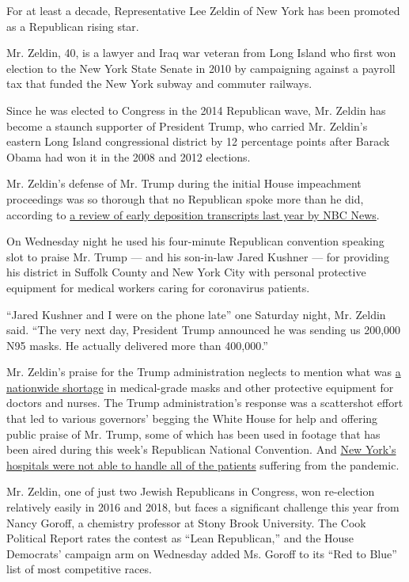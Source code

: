 For at least a decade, Representative Lee Zeldin of New York has been
promoted as a Republican rising star.

Mr. Zeldin, 40, is a lawyer and Iraq war veteran from Long Island who
first won election to the New York State Senate in 2010 by campaigning
against a payroll tax that funded the New York subway and commuter
railways.

Since he was elected to Congress in the 2014 Republican wave, Mr. Zeldin
has become a staunch supporter of President Trump, who carried Mr.
Zeldin's eastern Long Island congressional district by 12 percentage
points after Barack Obama had won it in the 2008 and 2012 elections.

Mr. Zeldin's defense of Mr. Trump during the initial House impeachment
proceedings was so thorough that no Republican spoke more than he did,
according to
\href{https://www.nbcnews.com/politics/trump-impeachment-inquiry/trump-s-defender-how-little-known-gop-lawmaker-became-point-n1076046}{a
review of early deposition transcripts last year by NBC News}.

On Wednesday night he used his four-minute Republican convention
speaking slot to praise Mr. Trump --- and his son-in-law Jared Kushner
--- for providing his district in Suffolk County and New York City with
personal protective equipment for medical workers caring for coronavirus
patients.

``Jared Kushner and I were on the phone late'' one Saturday night, Mr.
Zeldin said. ``The very next day, President Trump announced he was
sending us 200,000 N95 masks. He actually delivered more than 400,000.''

Mr. Zeldin's praise for the Trump administration neglects to mention
what was
\href{https://www.nytimes3xbfgragh.onion/article/face-masks-coronavirus.html}{a
nationwide shortage} in medical-grade masks and other protective
equipment for doctors and nurses. The Trump administration's response
was a scattershot effort that led to various governors' begging the
White House for help and offering public praise of Mr. Trump, some of
which has been used in footage that has been aired during this week's
Republican National Convention. And
\href{https://www.nytimes3xbfgragh.onion/2020/03/25/nyregion/nyc-coronavirus-hospitals.html}{New
York's hospitals were not able to handle all of the patients} suffering
from the pandemic.

Mr. Zeldin, one of just two Jewish Republicans in Congress, won
re-election relatively easily in 2016 and 2018, but faces a significant
challenge this year from Nancy Goroff, a chemistry professor at Stony
Brook University. The Cook Political Report rates the contest as ``Lean
Republican,'' and the House Democrats' campaign arm on Wednesday added
Ms. Goroff to its ``Red to Blue'' list of most competitive races.

